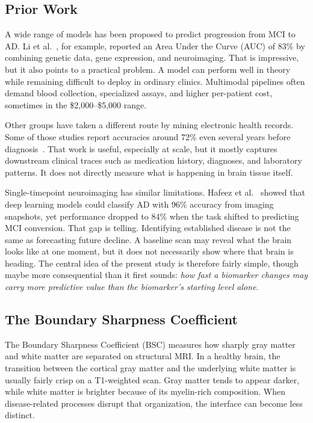 \documentclass[blue]{ludusofficial}
\begin{document}
\subsection{Prior Work}

A wide range of models has been proposed to predict progression from MCI to AD. Li et al.~\cite{li2021predicting}, for example, reported an Area Under the Curve (AUC) of 83\% by combining genetic data, gene expression, and neuroimaging. That is impressive, but it also points to a practical problem. A model can perform well in theory while remaining difficult to deploy in ordinary clinics. Multimodal pipelines often demand blood collection, specialized assays, and higher per-patient cost, sometimes in the \$2,000--\$5,000 range.

Other groups have taken a different route by mining electronic health records. Some of those studies report accuracies around 72\% even several years before diagnosis~\cite{north2025breakthroughs}. That work is useful, especially at scale, but it mostly captures downstream clinical traces such as medication history, diagnoses, and laboratory patterns. It does not directly measure what is happening in brain tissue itself.

Single-timepoint neuroimaging has similar limitations. Hafeez et al.~\cite{hafeez2024deep} showed that deep learning models could classify AD with 96\% accuracy from imaging snapshots, yet performance dropped to 84\% when the task shifted to predicting MCI conversion. That gap is telling. Identifying established disease is not the same as forecasting future decline. A baseline scan may reveal what the brain looks like at one moment, but it does not necessarily show where that brain is heading. The central idea of the present study is therefore fairly simple, though maybe more consequential than it first sounds: \textit{how fast a biomarker changes may carry more predictive value than the biomarker's starting level alone}.

\subsection{The Boundary Sharpness Coefficient}

The Boundary Sharpness Coefficient (BSC) measures how sharply gray matter and white matter are separated on structural MRI. In a healthy brain, the transition between the cortical gray matter and the underlying white matter is usually fairly crisp on a T1-weighted scan. Gray matter tends to appear darker, while white matter is brighter because of its myelin-rich composition. When disease-related processes disrupt that organization, the interface can become less distinct.
\end{document}
